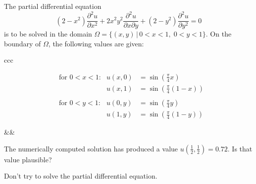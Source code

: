 The partial differential equation
\begin{equation}
(2-x^2)\frac{\partial^2 u}{\partial x^2}
+
2x^2y^2\frac{\partial^2 u}{\partial x\partial y}
+
(2-y^2)\frac{\partial^2 u}{\partial y^2}
=0
\label{70000008:pdgl}
\end{equation}
is to be solved in the domain
$\Omega=\{(x,y)\,|\, 0< x<1,\; 0<y<1\}$.
On the boundary of $\Omega$, the following values are given:
\begin{center}
\begin{tabular}{ccc}
\begin{minipage}{6cm}
\[
\begin{aligned}
&\text{for $0<x<1$:}&
u(x,0)&=\sin({\textstyle\frac\pi4} x)\\
&&
u(x,1)&=\sin({\textstyle\frac\pi4}(1-x))\\
\\
&\text{for $0<y<1$:}&
u(0,y)&=\sin({\textstyle\frac\pi4}y)\\
&&
u(1,y)&=\sin({\textstyle\frac\pi4}(1-y))
\end{aligned}
\]
\end{minipage}
&\qquad\qquad&
\begin{minipage}{8cm}
\begin{center}
\end{center}
\end{minipage}
\end{tabular}
\end{center}

The numerically computed solution has produced a value
$u(\frac12,\frac12)=0.72$.
Is that value plausible?

\begin{hinweis}
Don't try to solve the partial differential equation.
\end{hinweis}

